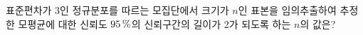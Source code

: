 표준편차가 3인 정규분포를 따르는 모집단에서 크기가 $n$인 표본을 임의추출하여 추정한 모평균에 대한 신뢰도 $95\mkern3mu \%$의 신뢰구간의 길이가 2가 되도록 하는 $n$의 값은? 

